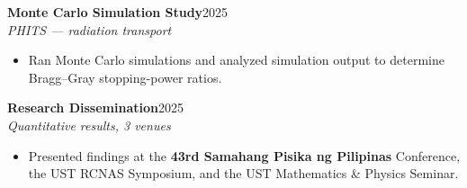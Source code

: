 \documentclass[10pt,letterpaper]{article}
\newcommand{\entry}[3]{%
  \vspace{5pt}%
  {\bfseries #1}\hfill{\small\color{muted}#3}\\
  {\itshape #2}\par\vspace{1pt}%
}
\newenvironment{cvbullets}
  {\begin{itemize}[leftmargin=1.15em,itemsep=1.5pt,topsep=2pt,parsep=0pt,
     label=\textcolor{accent}{\footnotesize$\bullet$}]}
  {\end{itemize}}
\begin{document}
\begin{minipage}[t]{0.64\textwidth}
\entry{Monte Carlo Simulation Study}{PHITS --- radiation transport}{2025}
\begin{cvbullets}
  \item Ran Monte Carlo simulations and analyzed simulation output to
        determine Bragg--Gray stopping-power ratios.
\end{cvbullets}

\entry{Research Dissemination}{Quantitative results, 3 venues}{2025}
\begin{cvbullets}
  \item Presented findings at the \textbf{43rd Samahang Pisika ng Pilipinas}
        Conference, the UST RCNAS Symposium, and the UST Mathematics \&
        Physics Seminar.
\end{cvbullets}

\end{minipage}
\end{document}
